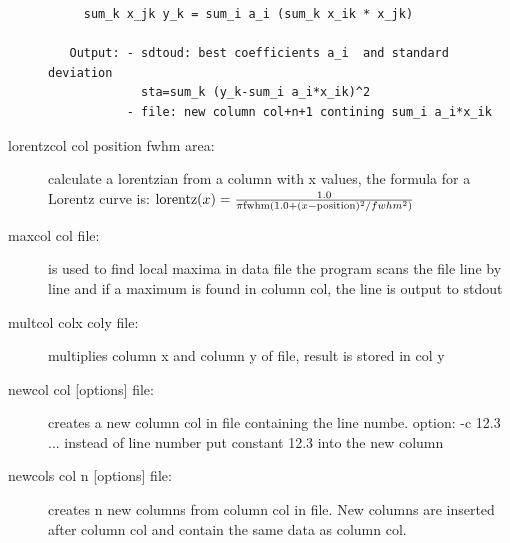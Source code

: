 \begin{description}
\begin{verbatim}
     sum_k x_jk y_k = sum_i a_i (sum_k x_ik * x_jk)

   Output: - sdtoud: best coefficients a_i  and standard deviation
             sta=sum_k (y_k-sum_i a_i*x_ik)^2
           - file: new column col+n+1 contining sum_i a_i*x_ik
\end{verbatim}
\item [\prg lorentzcol\index{lorentzcol}\label{lorentzcol} col position fwhm area:] calculate a lorentzian from
a column with x values, the formula for a Lorentz curve is: 
${\rm lorentz}(x)=\frac{1.0}{\pi{\rm fwhm}(1.0+(x-{\rm position})^2/fwhm^2)}$
\item [\prg maxcol\index{maxcol}  col file:] is used to find local maxima in data file
the program scans the file line by line and if a maximum is found 
 in column col, the line is output to stdout
\item [\prg multcol\index{multcol}  colx coly file:] multiplies column x and column y of file, %
result is stored in col y
\item [\prg newcol\index{newcol}\label{newcol} col {[options]} file:] creates a new column col in file containing the line numbe. option: -c 12.3  ... instead of line number put constant 12.3 into the new column
\item [\prg newcols\index{newcols}\label{newcols} col n {[options]} file:] creates n new columns from column col
 in file. New columns are inserted after column col and contain the same data as column col.

\end{description}

